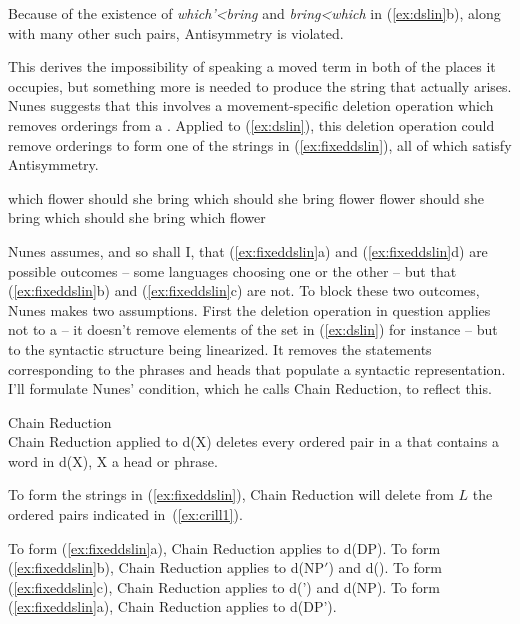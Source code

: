 \documentclass[output=paper]{langsci/langscibook}
\begin{document}
Because of the existence of \emph{which'<bring} and \emph{bring<which} in
(\ref{ex:dslin}b), along with many other such pairs, Antisymmetry is violated.

This derives the impossibility of speaking a moved term in both of the places
it occupies, but something more is needed to produce the string that actually
arises. Nunes suggests that this involves a movement-specific deletion
operation which removes orderings from a . Applied to
(\ref{ex:dslin}), this deletion operation could remove orderings to form one of
the strings in (\ref{ex:fixeddslin}), all of which satisfy Antisymmetry.
\begin{exe}
	\ex \label{ex:fixeddslin}
	\begin{xlist}
		\ex which flower should she bring
		\ex which should she bring flower
		\ex flower should she bring which
		\ex should she bring which flower
	\end{xlist}
\end{exe}

Nunes assumes, and so shall I, that (\ref{ex:fixeddslin}a) and
(\ref{ex:fixeddslin}d) are possible outcomes -- some languages choosing one or
the other -- but that (\ref{ex:fixeddslin}b) and (\ref{ex:fixeddslin}c) are
not. To block these two outcomes, Nunes makes two assumptions. First the
deletion operation in question applies not to a  -- it doesn't
remove elements of the set in (\ref{ex:dslin}) for instance -- but to the
syntactic structure being linearized. It removes the  statements
corresponding to the phrases and heads that populate a syntactic
representation. I'll formulate Nunes' condition, which he calls Chain
Reduction, to reflect this.
\begin{exe}
	\ex \label{ex:chain} Chain Reduction\\
	Chain Reduction applied to d(X) deletes every ordered pair in a  that contains a word in d(X), X a head or phrase.
\end{exe}

To form the strings in (\ref{ex:fixeddslin}), Chain Reduction will delete from $L$ the ordered pairs indicated in~(\ref{ex:crill1}).
\begin{exe}
	\ex \label{ex:crill1}
	\begin{xlist}
		\ex To form (\ref{ex:fixeddslin}a), Chain Reduction applies to d(DP).
		\ex To form (\ref{ex:fixeddslin}b), Chain Reduction applies to d(NP$'$) and d(\obar{D}).
		\ex To form (\ref{ex:fixeddslin}c), Chain Reduction applies to d(') and d(NP).
		\ex To form (\ref{ex:fixeddslin}a), Chain Reduction applies to d(DP').
	\end{xlist}
\end{exe}
\end{document}
